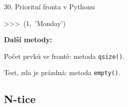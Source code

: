 \documentclass[czech]{beamer}
\newenvironment{lyxcode}
  {\par\begin{list}{}{
    \setlength{\rightmargin}{\leftmargin}
    \setlength{\listparindent}{0pt}%
    \raggedright
    \setlength{\itemsep}{0pt}
    \setlength{\parsep}{0pt}
    \normalfont\ttfamily}%
   \def\{{\char`\{}
   \def\}{\char`\}}
   \def\textasciitilde{\char`\~}
   \item[]}
  {\end{list}}
\begin{document}
\begin{frame}{30. Prioritní fronta v Pythonu}
\begin{lyxcode}
{\footnotesize >\textcompwordmark >\textcompwordmark >~(1,~'Monday')}{\footnotesize\par}
\end{lyxcode}
{\footnotesize\textbf{Další metody:}}{\footnotesize\par}

{\footnotesize Počet prvků ve frontě: metoda }{\footnotesize\texttt{qsize()}}{\footnotesize .}{\footnotesize\par}

{\footnotesize Test, zda je prázdná: metoda }{\footnotesize\texttt{empty()}}{\footnotesize .}{\footnotesize\par}
\end{frame}


\subsection{N-tice}
\end{document}
